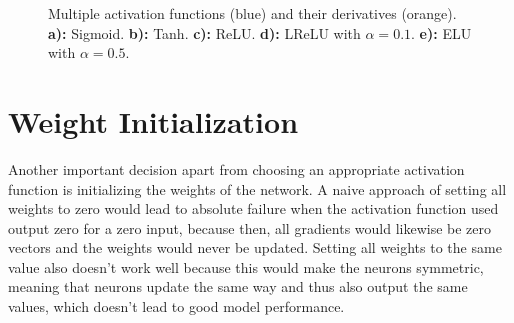 \begin {figure}[!ht]
	\begin{center}
	\begin {subfigure}[{position=b}]{0.3\linewidth}
		\scalebox{0.60}{}
		\caption{}
	\end {subfigure}
	\begin {subfigure}[{position=b}]{0.3\linewidth}
		\scalebox{0.60}{}
		\caption{}
	\end {subfigure}
	\end{center}

	\begin {center}
	\begin {subfigure}[{position=b}]{0.3\linewidth}
		\scalebox{0.60}{}
		\caption{}
	\end {subfigure}
	\begin {subfigure}[{position=b}]{0.3\linewidth}
		\scalebox{0.60}{}
		\caption{}
	\end {subfigure}
	\begin {subfigure}[{position=b}]{0.3\linewidth}
		\scalebox{0.60}{}
		\caption{}
	\end {subfigure}
	\end{center}

		\caption[]{Multiple activation functions (blue) and their derivatives (orange). \textbf{a):} Sigmoid. \textbf{b):} Tanh. \textbf{c):} ReLU. \textbf{d):} LReLU with $\alpha = 0.1$. \textbf{e):} ELU with $\alpha = 0.5$.}
		\label{fig:activation_functions}

\end {figure}



	\section{Weight Initialization}
\label{sec:weight_init}
Another important decision apart from choosing an appropriate activation function is initializing the weights of the network. A naive approach of setting all weights to zero would lead to absolute failure when the activation function used output zero for a zero input, because then, all gradients would likewise be zero vectors and the weights would never be updated. Setting all weights to the same value also doesn't work well because this would make the neurons symmetric, meaning that neurons update the same way and thus also output the same values, which doesn't lead to good model performance.

